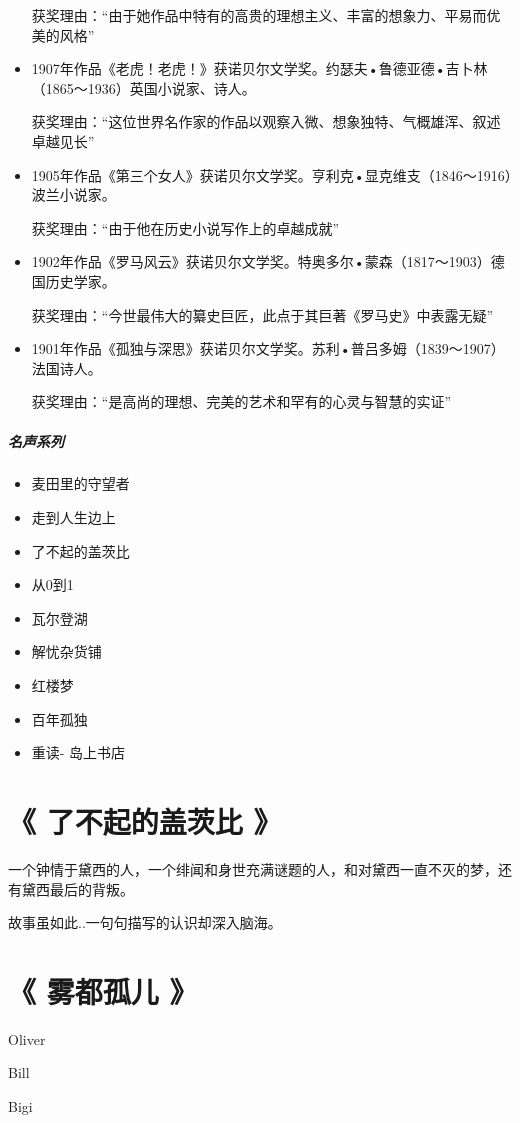 \documentclass[UTF8,a4paper,8pt]{ctexart}
\begin{document}
\begin{itemize}
			获奖理由：“由于她作品中特有的高贵的理想主义、丰富的想象力、平易而优美的风格”
			\item 1907年作品《老虎！老虎！》获诺贝尔文学奖。约瑟夫•鲁德亚德•吉卜林（1865～1936）英国小说家、诗人。
		
			获奖理由：“这位世界名作家的作品以观察入微、想象独特、气概雄浑、叙述卓越见长”
			\item 1905年作品《第三个女人》获诺贝尔文学奖。亨利克•显克维支（1846～1916）波兰小说家。
			
			获奖理由：“由于他在历史小说写作上的卓越成就”
			\item 1902年作品《罗马风云》获诺贝尔文学奖。特奥多尔•蒙森（1817～1903）德国历史学家。
			
			获奖理由：“今世最伟大的纂史巨匠，此点于其巨著《罗马史》中表露无疑”
			\item 1901年作品《孤独与深思》获诺贝尔文学奖。苏利•普吕多姆（1839～1907）法国诗人。
			
			获奖理由：“是高尚的理想、完美的艺术和罕有的心灵与智慧的实证” 
		\end{itemize}
	
		\subparagraph{名声系列}
		\begin{itemize}
			\item 麦田里的守望者
			\item 走到人生边上
			\item 了不起的盖茨比
			\item 从0到1
			\item 瓦尔登湖
			\item 解忧杂货铺
			\item 红楼梦
			\item 百年孤独
			\item 重读- 岛上书店
		\end{itemize}
		
	\section{《 了不起的盖茨比  》  }  
		一个钟情于黛西的人，一个绯闻和身世充满谜题的人，和对黛西一直不灭的梦，还有黛西最后的背叛。
		
		故事虽如此..一句句描写的认识却深入脑海。
	
	\section{《 雾都孤儿 》  }  	
		Oliver
		
		Bill
		
		Bigi
	
\end{document}
